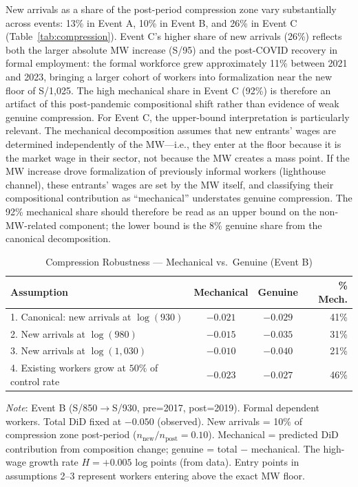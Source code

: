 \documentclass[12pt]{article}
\begin{document}
New arrivals as a share of the post-period compression zone vary substantially across events: 13\% in Event A, 10\% in Event B, and 26\% in Event C (Table~\ref{tab:compression}). Event C's higher share of new arrivals (26\%) reflects both the larger absolute MW increase (S/95) and the post-COVID recovery in formal employment: the formal workforce grew approximately 11\% between 2021 and 2023, bringing a larger cohort of workers into formalization near the new floor of S/1,025. The high mechanical share in Event C (92\%) is therefore an artifact of this post-pandemic compositional shift rather than evidence of weak genuine compression. For Event C, the upper-bound interpretation is particularly relevant. The mechanical decomposition assumes that new entrants' wages are determined independently of the MW---i.e., they enter at the floor because it is the market wage in their sector, not because the MW creates a mass point. If the MW increase drove formalization of previously informal workers (lighthouse channel), these entrants' wages are set by the MW itself, and classifying their compositional contribution as ``mechanical'' understates genuine compression. The 92\% mechanical share should therefore be read as an upper bound on the non-MW-related component; the lower bound is the 8\% genuine share from the canonical decomposition.

\begin{table}[H]
\centering
\caption{Compression Robustness --- Mechanical vs.\ Genuine (Event B)}
\label{tab:comp_robust}
\begin{threeparttable}
\small
\begin{tabular}{lccr}
\toprule
Assumption & Mechanical & Genuine & \% Mech. \\
\midrule
1. Canonical: new arrivals at $\log(930)$     & $-0.021$ & $-0.029$ & 41\% \\
2. New arrivals at $\log(980)$                & $-0.015$ & $-0.035$ & 31\% \\
3. New arrivals at $\log(1{,}030)$            & $-0.010$ & $-0.040$ & 21\% \\
4. Existing workers grow at $50\%$ of control rate & $-0.023$ & $-0.027$ & 46\% \\
\bottomrule
\end{tabular}
\begin{tablenotes}
\small
\item \textit{Note}: Event B (S/850$\to$S/930, pre=2017, post=2019). Formal dependent workers. Total DiD fixed at $-0.050$ (observed). New arrivals = 10\% of compression zone post-period ($n_\text{new}/n_\text{post} = 0.10$). Mechanical = predicted DiD contribution from composition change; genuine = total $-$ mechanical. The high-wage growth rate $H = +0.005$ log points (from data). Entry points in assumptions 2--3 represent workers entering above the exact MW floor.
\end{tablenotes}
\end{threeparttable}
\end{table}
\end{document}
